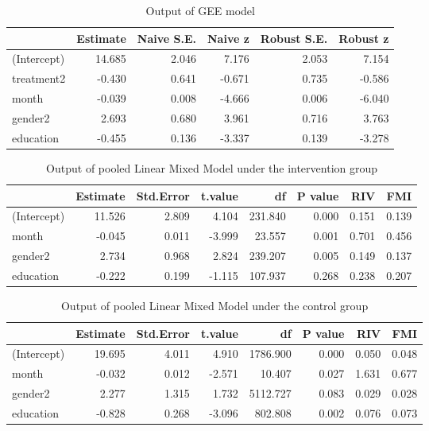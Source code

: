\begin{table}[H]
\centering
\begin{tabular}{|l|r|r|r|r|r|}
\hline
  & Estimate & Naive S.E. & Naive z & Robust S.E. & Robust z\\
\hline
(Intercept) & 14.685 & 2.046 & 7.176 & 2.053 & 7.154\\
\hline
treatment2 & -0.430 & 0.641 & -0.671 & 0.735 & -0.586\\
\hline
month & -0.039 & 0.008 & -4.666 & 0.006 & -6.040\\
\hline
gender2 & 2.693 & 0.680 & 3.961 & 0.716 & 3.763\\
\hline
education & -0.455 & 0.136 & -3.337 & 0.139 & -3.278\\
\hline
\end{tabular}
\caption{Output of GEE model}
\label{tab:gee}
\end{table}

\begin{table}[H]
\centering
\begin{tabular}{|l|r|r|r|r|r|r|r|}
\hline
  & Estimate & Std.Error & t.value & df & P value & RIV & FMI\\
\hline
(Intercept) & 11.526 & 2.809 & 4.104 & 231.840 & 0.000 & 0.151 & 0.139\\
\hline
month & -0.045 & 0.011 & -3.999 & 23.557 & 0.001 & 0.701 & 0.456\\
\hline
gender2 & 2.734 & 0.968 & 2.824 & 239.207 & 0.005 & 0.149 & 0.137\\
\hline
education & -0.222 & 0.199 & -1.115 & 107.937 & 0.268 & 0.238 & 0.207\\
\hline
\end{tabular}
\caption{Output of pooled Linear Mixed Model under the intervention group}
\label{tab:lme.treatment.mi}
\end{table}

\begin{table}[H]
\centering
\begin{tabular}{|l|r|r|r|r|r|r|r|}
\hline
  & Estimate & Std.Error & t.value & df & P value & RIV & FMI\\
\hline
(Intercept) & 19.695 & 4.011 & 4.910 & 1786.900 & 0.000 & 0.050 & 0.048\\
\hline
month & -0.032 & 0.012 & -2.571 & 10.407 & 0.027 & 1.631 & 0.677\\
\hline
gender2 & 2.277 & 1.315 & 1.732 & 5112.727 & 0.083 & 0.029 & 0.028\\
\hline
education & -0.828 & 0.268 & -3.096 & 802.808 & 0.002 & 0.076 & 0.073\\
\hline
\end{tabular}
\caption{Output of pooled Linear Mixed Model under the control group}
\label{tab:lme.control.mi}
\end{table}

